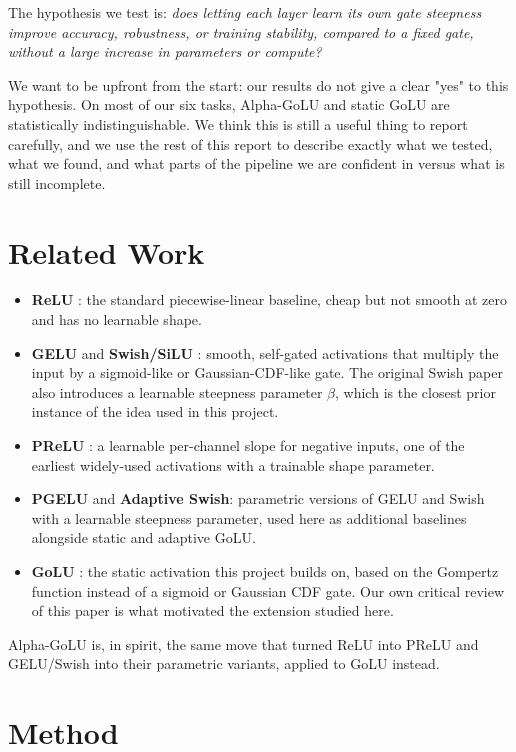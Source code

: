 \documentclass[conference]{IEEEtran}
\begin{document}
The hypothesis we test is: \emph{does letting each layer learn its own gate steepness improve accuracy, robustness, or training stability, compared to a fixed gate, without a large increase in parameters or compute?}

We want to be upfront from the start: our results do not give a clear "yes" to this hypothesis. On most of our six tasks, Alpha-GoLU and static GoLU are statistically indistinguishable. We think this is still a useful thing to report carefully, and we use the rest of this report to describe exactly what we tested, what we found, and what parts of the pipeline we are confident in versus what is still incomplete.

\section{Related Work}

\begin{itemize}
\item \textbf{ReLU} \cite{relu2010}: the standard piecewise-linear baseline, cheap but not smooth at zero and has no learnable shape.
\item \textbf{GELU} \cite{gelu2016} and \textbf{Swish/SiLU} \cite{swish2017}: smooth, self-gated activations that multiply the input by a sigmoid-like or Gaussian-CDF-like gate. The original Swish paper also introduces a learnable steepness parameter $\beta$, which is the closest prior instance of the idea used in this project.
\item \textbf{PReLU} \cite{prelu2015}: a learnable per-channel slope for negative inputs, one of the earliest widely-used activations with a trainable shape parameter.
\item \textbf{PGELU} and \textbf{Adaptive Swish}: parametric versions of GELU and Swish with a learnable steepness parameter, used here as additional baselines alongside static and adaptive GoLU.
\item \textbf{GoLU} \cite{golu2025}: the static activation this project builds on, based on the Gompertz function instead of a sigmoid or Gaussian CDF gate. Our own critical review of this paper \cite{kopic2026critical} is what motivated the extension studied here.
\end{itemize}

Alpha-GoLU is, in spirit, the same move that turned ReLU into PReLU and GELU/Swish into their parametric variants, applied to GoLU instead.

\section{Method}
\end{document}
